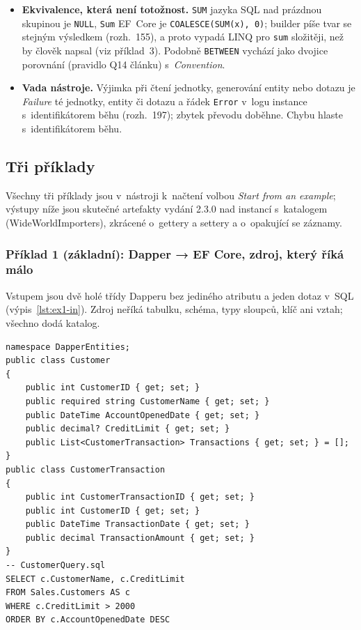 \documentclass{article}
\begin{document}
\begin{itemize}[leftmargin=*,itemsep=2pt]
\item \textbf{Ekvivalence, která není totožnost.} \texttt{SUM} jazyka SQL nad prázdnou skupinou je \texttt{NULL}, \texttt{Sum} EF~Core je \texttt{COALESCE(SUM(x), 0)}; builder píše tvar se stejným výsledkem (rozh.~155), a proto vypadá LINQ pro \texttt{sum} složitěji, než by člověk napsal (viz příklad~3). Podobně \texttt{BETWEEN} vychází jako dvojice porovnání (pravidlo Q14 článku) s~\emph{Convention}.
\item \textbf{Vada nástroje.} Výjimka při čtení jednotky, generování entity nebo dotazu je \emph{Failure} té jednotky, entity či dotazu a řádek \texttt{Error} v~logu instance s~identifikátorem běhu (rozh.~197); zbytek převodu doběhne. Chybu hlaste s~identifikátorem běhu.
\end{itemize}
\subsection{Tři příklady}\label{sec:priklady}

Všechny tři příklady jsou v~nástroji k~načtení volbou \emph{Start from an example}; výstupy níže jsou skutečné artefakty vydání 2.3.0 nad instancí s~katalogem (WideWorldImporters), zkrácené o~gettery a settery a o~opakující se záznamy.

\subsubsection*{Příklad 1 (základní): Dapper → EF Core, zdroj, který říká málo}

Vstupem jsou dvě holé třídy Dapperu bez jediného atributu a jeden dotaz v~SQL (výpis~\ref{lst:ex1-in}). Zdroj neříká tabulku, schéma, typy sloupců, klíč ani vztah; všechno dodá katalog.

\begin{lstlisting}[language={[Sharp]C},caption={Příklad 1, vstup: \texttt{Customer.cs}, \texttt{CustomerTransaction.cs} (zkráceno) a \texttt{CustomerQuery.sql}.},label={lst:ex1-in}]
namespace DapperEntities;
public class Customer
{
    public int CustomerID { get; set; }
    public required string CustomerName { get; set; }
    public DateTime AccountOpenedDate { get; set; }
    public decimal? CreditLimit { get; set; }
    public List<CustomerTransaction> Transactions { get; set; } = [];
}
public class CustomerTransaction
{
    public int CustomerTransactionID { get; set; }
    public int CustomerID { get; set; }
    public DateTime TransactionDate { get; set; }
    public decimal TransactionAmount { get; set; }
}
-- CustomerQuery.sql
SELECT c.CustomerName, c.CreditLimit
FROM Sales.Customers AS c
WHERE c.CreditLimit > 2000
ORDER BY c.AccountOpenedDate DESC
\end{lstlisting}
\end{document}
